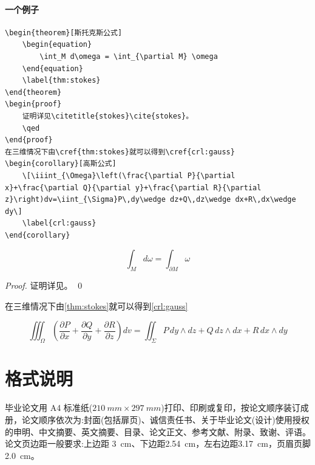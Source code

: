 \documentclass{LZU}
\begin{document}
\subsubsection{一个例子}
\begin{verbatim}
\begin{theorem}[斯托克斯公式]
    \begin{equation}
        \int_M d\omega = \int_{\partial M} \omega
    \end{equation}
    \label{thm:stokes}
\end{theorem}
\begin{proof}
    证明详见\citetitle{stokes}\cite{stokes}。
    \qed
\end{proof}
在三维情况下由\cref{thm:stokes}就可以得到\cref{crl:gauss}
\begin{corollary}[高斯公式]
    \[\iiint_{\Omega}\left(\frac{\partial P}{\partial x}+\frac{\partial Q}{\partial y}+\frac{\partial R}{\partial z}\right)dv=\iint_{\Sigma}P\,dy\wedge dz+Q\,dz\wedge dx+R\,dx\wedge dy\]
    \label{crl:gauss}
\end{corollary}
\end{verbatim}

\begin{theorem}[斯托克斯公式]
    \begin{equation}
        \int_M d\omega = \int_{\partial M} \omega
    \end{equation}
    \label{thm:stokes}
\end{theorem}
\begin{proof}
    证明详见\cite{stokes}。
    \qed
\end{proof}
在三维情况下由\cref{thm:stokes}就可以得到\cref{crl:gauss}
\begin{corollary}[高斯公式]
    \[\iiint_{\Omega}\left(\frac{\partial P}{\partial x}+\frac{\partial Q}{\partial y}+\frac{\partial R}{\partial z}\right)dv=\iint_{\Sigma}P\,dy\wedge dz+Q\,dz\wedge dx+R\,dx\wedge dy\]
    \label{crl:gauss}
\end{corollary}



\chapter{格式说明}
\label{chp:format}
毕业论文用 A4 标准纸($\SI{210}{mm}\times \SI{297}{mm}$)打印、印刷或复印，按论文顺序装订成册，论文顺序依次为:封面(包括扉页)、诚信责任书、关于毕业论文(设计)使用授权的申明、中文摘要、英文摘要、目录、论文正文、参考文献、附录、致谢、评语。论文页边距一般要求:上边距 \SI{3}{cm}、下边距\SI{2.54}{cm}，左右边距\SI{3.17}{cm}，页眉页脚\SI{2.0}{cm}。
\end{document}
